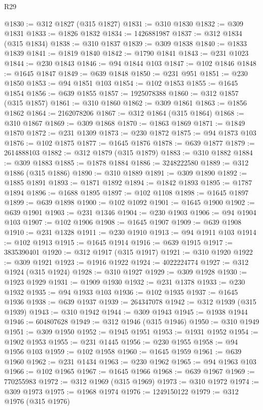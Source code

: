\begin{lexlean}{R29}
\begin{coremodule}
@1830 := @312 @1827 (@315 @1827)
@1831 := @310 @1830
@1832 := @309 @1831
@1833 := @1826 @1832
@1834 := 1426881987
@1837 := @312 @1834 (@315 @1834)
@1838 := @310 @1837
@1839 := @309 @1838
@1840 := @1833 @1839
@1841 := @1819 @1840
@1842 := @1790 @1841
@1843 := @231 @1023
@1844 := @230 @1843
@1846 := @94 @1844 @103
@1847 := @102 @1846
@1848 := @1645 @1847
@1849 := @639 @1848
@1850 := @231 @951
@1851 := @230 @1850
@1853 := @94 @1851 @103
@1854 := @102 @1853
@1855 := @1645 @1854
@1856 := @639 @1855
@1857 := 1925078388
@1860 := @312 @1857 (@315 @1857)
@1861 := @310 @1860
@1862 := @309 @1861
@1863 := @1856 @1862
@1864 := 2162078206
@1867 := @312 @1864 (@315 @1864)
@1868 := @310 @1867
@1869 := @309 @1868
@1870 := @1863 @1869
@1871 := @1849 @1870
@1872 := @231 @1309
@1873 := @230 @1872
@1875 := @94 @1873 @103
@1876 := @102 @1875
@1877 := @1645 @1876
@1878 := @639 @1877
@1879 := 2614888103
@1882 := @312 @1879 (@315 @1879)
@1883 := @310 @1882
@1884 := @309 @1883
@1885 := @1878 @1884
@1886 := 3248222580
@1889 := @312 @1886 (@315 @1886)
@1890 := @310 @1889
@1891 := @309 @1890
@1892 := @1885 @1891
@1893 := @1871 @1892
@1894 := @1842 @1893
@1895 := @1787 @1894
@1896 := @1688 @1895
@1897 := @102 @1108
@1898 := @1645 @1897
@1899 := @639 @1898
@1900 := @102 @1092
@1901 := @1645 @1900
@1902 := @639 @1901
@1903 := @231 @1346
@1904 := @230 @1903
@1906 := @94 @1904 @103
@1907 := @102 @1906
@1908 := @1645 @1907
@1909 := @639 @1908
@1910 := @231 @1328
@1911 := @230 @1910
@1913 := @94 @1911 @103
@1914 := @102 @1913
@1915 := @1645 @1914
@1916 := @639 @1915
@1917 := 3835390401
@1920 := @312 @1917 (@315 @1917)
@1921 := @310 @1920
@1922 := @309 @1921
@1923 := @1916 @1922
@1924 := 4022224774
@1927 := @312 @1924 (@315 @1924)
@1928 := @310 @1927
@1929 := @309 @1928
@1930 := @1923 @1929
@1931 := @1909 @1930
@1932 := @231 @1378
@1933 := @230 @1932
@1935 := @94 @1933 @103
@1936 := @102 @1935
@1937 := @1645 @1936
@1938 := @639 @1937
@1939 := 264347078
@1942 := @312 @1939 (@315 @1939)
@1943 := @310 @1942
@1944 := @309 @1943
@1945 := @1938 @1944
@1946 := 604807628
@1949 := @312 @1946 (@315 @1946)
@1950 := @310 @1949
@1951 := @309 @1950
@1952 := @1945 @1951
@1953 := @1931 @1952
@1954 := @1902 @1953
@1955 := @231 @1445
@1956 := @230 @1955
@1958 := @94 @1956 @103
@1959 := @102 @1958
@1960 := @1645 @1959
@1961 := @639 @1960
@1962 := @231 @1434
@1963 := @230 @1962
@1965 := @94 @1963 @103
@1966 := @102 @1965
@1967 := @1645 @1966
@1968 := @639 @1967
@1969 := 770255983
@1972 := @312 @1969 (@315 @1969)
@1973 := @310 @1972
@1974 := @309 @1973
@1975 := @1968 @1974
@1976 := 1249150122
@1979 := @312 @1976 (@315 @1976)

\end{coremodule}
\end{lexlean}

